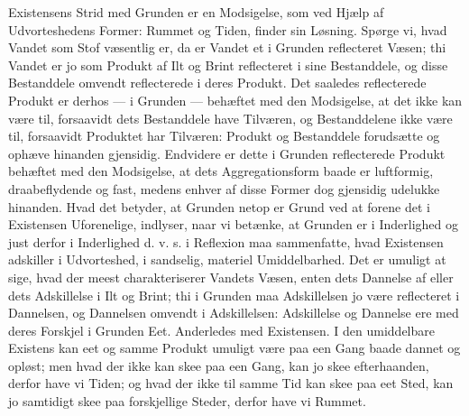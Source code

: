\documentclass[12pt,a4paper]{book}
\begin{document}
Existensens Strid med Grunden er en Modsigelse, som
ved Hjælp af Udvorteshedens Former: Rummet og Tiden,
finder sin Løsning. Spørge vi, hvad Vandet som Stof
væsentlig er, da er Vandet et i Grunden reflecteret Væsen;
thi Vandet er jo som Produkt af Ilt og Brint reflecteret i
sine Bestanddele, og disse Bestanddele omvendt reflecterede i
deres Produkt. Det saaledes reflecterede Produkt er derhos
--- i Grunden --- behæftet med den Modsigelse, at det ikke
kan være til, forsaavidt dets Bestanddele have Tilværen, og
Bestanddelene ikke være til, forsaavidt Produktet har Tilværen:
Produkt og Bestanddele forudsætte og ophæve hinanden
gjensidig. Endvidere er dette i Grunden reflecterede Produkt
behæftet med den Modsigelse, at dets Aggregationsform baade
er luftformig, draabeflydende og fast, medens enhver af disse
Former dog gjensidig udelukke hinanden. Hvad det betyder,
at Grunden netop er Grund ved at forene det i Existensen
Uforenelige, indlyser, naar vi betænke, at Grunden er i
Inderlighed og just derfor i Inderlighed d. v. s. i Reflexion maa
sammenfatte, hvad Existensen adskiller i Udvorteshed, i sandselig,
materiel Umiddelbarhed. Det er umuligt at sige, hvad der
meest charakteriserer Vandets Væsen, enten dets Dannelse af
eller dets Adskillelse i Ilt og Brint; thi i Grunden maa
Adskillelsen jo være reflecteret i Dannelsen, og Dannelsen
omvendt i Adskillelsen: Adskillelse og Dannelse ere med deres
Forskjel i Grunden Eet. Anderledes med Existensen. I
den umiddelbare Existens kan eet og samme Produkt umuligt
være paa een Gang baade dannet og opløst; men hvad der
ikke kan skee paa een Gang, kan jo skee efterhaanden, derfor
have vi Tiden; og hvad der ikke til samme Tid kan skee paa
eet Sted, kan jo samtidigt skee paa forskjellige Steder, derfor
have vi Rummet.
\end{document}

